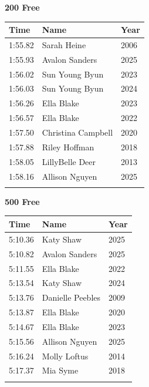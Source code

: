 \vspace{0.5em}
\noindent\begin{minipage}[t]{0.48\textwidth}
\centering
\textbf{\textcolor{teamprimary}{200 Free}}\par
\vspace{0.5em}
\centering
\small
\renewcommand{\arraystretch}{1.0}
\setlength{\tabcolsep}{4pt}
\begin{tabular}{@{}p{1.8cm}p{3.0cm}p{1.0cm}@{}}
\toprule
\textbf{Time} & \textbf{Name} & \textbf{Year} \\
\midrule
1:55.82 & Sarah Heine & 2006 \\
1:55.93 & Avalon Sanders & 2025 \\
1:56.02 & Sun Young Byun & 2023 \\
1:56.03 & Sun Young Byun & 2024 \\
1:56.26 & Ella Blake & 2023 \\
1:56.57 & Ella Blake & 2022 \\
1:57.50 & Christina Campbell & 2020 \\
1:57.88 & Riley Hoffman & 2018 \\
1:58.05 & LillyBelle Deer & 2013 \\
1:58.16 & Allison Nguyen & 2025 \\
\bottomrule
\vspace{0.5em}
\end{tabular}
\end{minipage}
\hfill
\begin{minipage}[t]{0.48\textwidth}
\centering
\textbf{\textcolor{teamprimary}{500 Free}}\par
\vspace{0.5em}
\centering
\small
\renewcommand{\arraystretch}{1.0}
\setlength{\tabcolsep}{4pt}
\begin{tabular}{@{}p{1.8cm}p{3.0cm}p{1.0cm}@{}}
\toprule
\textbf{Time} & \textbf{Name} & \textbf{Year} \\
\midrule
5:10.36 & Katy Shaw & 2025 \\
5:10.82 & Avalon Sanders & 2025 \\
5:11.55 & Ella Blake & 2022 \\
5:13.54 & Katy Shaw & 2024 \\
5:13.76 & Danielle Peebles & 2009 \\
5:13.87 & Ella Blake & 2020 \\
5:14.67 & Ella Blake & 2023 \\
5:15.56 & Allison Nguyen & 2025 \\
5:16.24 & Molly Loftus & 2014 \\
5:17.37 & Mia Syme & 2018 \\
\bottomrule
\vspace{0.5em}
\end{tabular}
\end{minipage}
